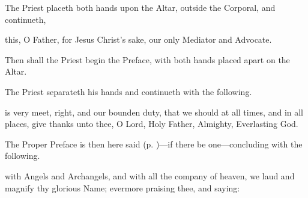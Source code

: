 \begin{rubric}
	 The Priest placeth both hands upon the Altar, outside the Corporal, and continueth,
\end{rubric}
 this, O Father, for Jesus Christ's sake, our only Mediator and Advocate.\par
{}
\clearpage
{}
\begin{rubric}
    Then shall the Priest begin the Preface, with both hands placed apart on the Altar.
\end{rubric}
\begin{rubric}
	The Priest separateth his hands and continueth with the following.
\end{rubric}
 is very meet, right, and our bounden duty, that we should at all times, and in all places, give thanks unto thee, O Lord, Holy Father, Almighty, Everlasting God.
\begin{rubric}
    The Proper Preface is then here said (p. \pageref{prefaces})---if there be one---concluding with the following.
\end{rubric}
\label{PrefaceEnding}
 with Angels and Archangels, and with all the company of heaven, we laud and magnify thy glorious Name; evermore praising thee, and saying:%

